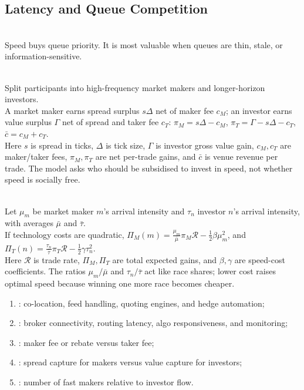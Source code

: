 \subsection{Latency and Queue Competition}

\begin{principle} \\
Speed buys queue priority. It is most valuable when queues are thin, stale, or information-sensitive.
\end{principle}

\begin{model} \\
Split participants into high-frequency market makers and longer-horizon investors.\\
A market maker earns spread surplus $s\Delta$ net of maker fee $c_M$; an investor earns value surplus $\Gamma$ net of spread and taker fee $c_T$: $\pi_M=s\Delta-c_M$, $\pi_T=\Gamma-s\Delta-c_T$, $\bar{c}=c_M+c_T$.\\
Here $s$ is spread in ticks, $\Delta$ is tick size, $\Gamma$ is investor gross value gain, $c_M,c_T$ are maker/taker fees, $\pi_M,\pi_T$ are net per-trade gains, and $\bar{c}$ is venue revenue per trade. The model asks who should be subsidised to invest in speed, not whether speed is socially free.
\end{model}

\begin{mechanism} \\
Let $\mu_m$ be market maker $m$'s arrival intensity and $\tau_n$ investor $n$'s arrival intensity, with averages $\bar{\mu}$ and $\bar{\tau}$.\\
If technology costs are quadratic, $\Pi_M(m)=\frac{\mu_m}{\bar{\mu}}\pi_M\mathcal{R}-\frac{1}{2}\beta\mu_m^2$, and $\Pi_T(n)=\frac{\tau_n}{\bar{\tau}}\pi_T\mathcal{R}-\frac{1}{2}\gamma\tau_n^2$.\\
Here $\mathcal{R}$ is trade rate, $\Pi_M,\Pi_T$ are total expected gains, and $\beta,\gamma$ are speed-cost coefficients. The ratios $\mu_m/\bar{\mu}$ and $\tau_n/\bar{\tau}$ act like race shares; lower cost raises optimal speed because winning one more race becomes cheaper.
\end{mechanism}

\begin{taxonomy} 
\begin{enumerate}[label=\roman*.]
\setlength{\itemsep}{0pt}
\item {}: co-location, feed handling, quoting engines, and hedge automation;
\item {}: broker connectivity, routing latency, algo responsiveness, and monitoring;
\item {}: maker fee or rebate versus taker fee;
\item {}: spread capture for makers versus value capture for investors;
\item {}: number of fast makers relative to investor flow.
\end{enumerate}
\end{taxonomy}

